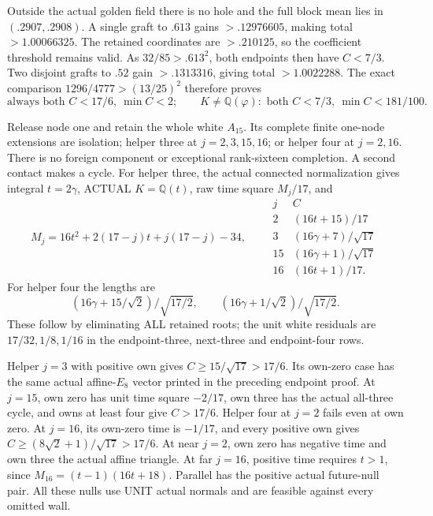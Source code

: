 \documentclass[11pt]{article}
\begin{document}
Outside the actual golden field there is no hole and the
full block mean lies in \((.2907,.2908)\).
A single graft to \(.613\) gains \(>.12976605\), making total
\(>1.00066325\).
The retained coordinates are \(>.210125\), so the coefficient
threshold remains valid.
As \(32/85>.613^2\), both endpoints then have \(C<7/3\).
Two disjoint grafts to \(.52\) gain \(>.1313316\), giving total
\(>1.0022288\).
The exact comparison
\(1296/4777>(13/25)^2\) therefore proves
\[
 \text{always both }C<17/6,\ \min C<2;\qquad
 K\ne\mathbb Q(\varphi):
        \text{ both }C<7/3,\ \min C<181/100 .
\tag{A16lengths}\label{eq:arithA16lengths}
\]

Release node one and retain the whole white \(A_{15}\).
Its complete finite one-node extensions are isolation;
helper three at \(j=2,3,15,16\); or helper four at \(j=2,16\).
There is no foreign component or exceptional rank-sixteen
completion.  A second contact makes a cycle.
For helper three, the actual connected normalization gives
integral \(t=2\gamma\), ACTUAL \(K=\mathbb Q(t)\), raw
time square \(M_j/17\), and
\[
 M_j=16t^2+2(17-j)t+j(17-j)-34,\qquad
\begin{array}{c|c}
j&C\\ \hline
2&(16t+15)/17\\
3&(16\gamma+7)/\sqrt{17}\\
15&(16\gamma+1)/\sqrt{17}\\
16&(16t+1)/17 .
\end{array}
\]
For helper four the lengths are
\[
 (16\gamma+15/\sqrt2)/\sqrt{17/2},\qquad
 (16\gamma+1/\sqrt2)/\sqrt{17/2}.
\]
These follow by eliminating ALL retained roots; the unit white
residuals are \(17/32,1/8,1/16\) in the endpoint-three,
next-three and endpoint-four rows.

Helper \(j=3\) with positive own gives
\(C\ge15/\sqrt{17}>17/6\).
Its own-zero case has the same actual affine-\(E_8\) vector
printed in the preceding endpoint proof.
At \(j=15\), own zero has unit time square \(-2/17\), own three
has the actual all-three cycle, and owns at least four give
\(C>17/6\).
Helper four at \(j=2\) fails even at own zero.
At \(j=16\), its own-zero time is \(-1/17\), and every positive
own gives \(C\ge(8\sqrt2+1)/\sqrt{17}>17/6\).
At near \(j=2\), own zero has negative time and own three
the actual affine triangle.
At far \(j=16\), positive time requires \(t>1\), since
\(M_{16}=(t-1)(16t+18)\).
Parallel has the positive actual future-null pair.
All these nulls use UNIT actual normals and are feasible
against every omitted wall.
\end{document}
